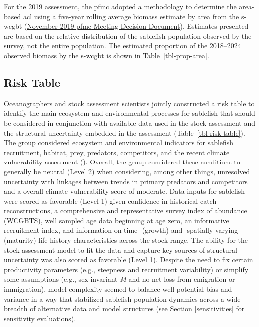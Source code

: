 \documentclass[
  english,
]{article}
\begin{document}
For the 2019 assessment, the \gls{pfmc} adopted a methodology to
determine the area-based \gls{acl} using a five-year rolling average
biomass estimate by area from the \gls{s-wcgbt}
(\href{https://www.pcouncil.org/documents/2019/11/november-2019-decision-document.pdf/}{November
2019 \gls{pfmc} Meeting Decision Document}). Estimates presented are
based on the relative distribution of the sablefish population observed
by the survey, not the entire population. The estimated proportion of
the 2018--2024 observed biomass by the \gls{s-wcgbt} is shown in
Table~\ref{tbl-prop-area}.

\subsection{Risk Table}\label{risk}

Oceanographers and stock assessment scientists jointly constructed a
risk table to identify the main ecosystem and environmental processes
for sablefish that should be considered in conjunction with available
data used in the stock assessment and the structural uncertainty
embedded in the assessment (Table~\ref{tbl-risk-table}). The group
considered ecosystem and environmental indicators for sablefish
recruitment, habitat, prey, predators, competitors, and the recent
climate vulnerability assessment
(). Overall, the
group considered these conditions to generally be neutral (Level 2) when
considering, among other things, unresolved uncertainty with linkages
between trends in primary predators and competitors and a overall
climate vulnerability score of moderate. Data inputs for sablefish were
scored as favorable (Level 1) given confidence in historical catch
reconstructions, a comprehensive and representative survey index of
abundance (WCGBTS), well sampled age data beginning at age zero, an
informative recruitment index, and information on time- (growth) and
-spatially-varying (maturity) life history characteristics across the
stock range. The ability for the stock assessment model to fit the data
and capture key sources of structural uncertainty was also scored as
favorable (Level 1). Despite the need to fix certain productivity
parameters (e.g., steepness and recruitment variability) or simplify
some assumptions (e.g., sex invariant \emph{M} and no net loss from
emigration or immigration), model complexity seemed to balance well
potential bias and variance in a way that stabilized sablefish
population dynamics across a wide breadth of alternative data and model
structures (see Section \ref{sensitivities} for sensitivity
evaluations).
\end{document}
